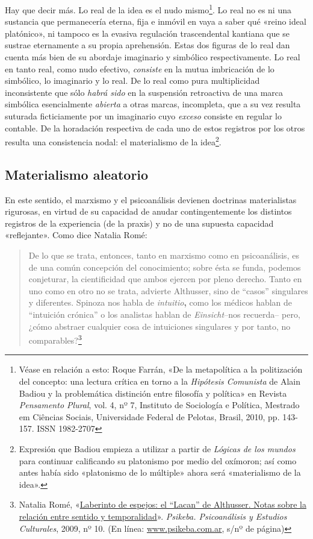 Hay que decir más. Lo real de la idea es el nudo mismo\footnote{Véase en relación a esto: Roque Farrán, «De la metapolítica a la politización del concepto: una lectura crítica en torno a la \emph{Hipótesis Comunista} de Alain Badiou y la problemática distinción entre filosofía y política» en Revista \emph{Pensamento Plural}, vol. 4, nº 7, Instituto de Sociología e Política, Mestrado em Ciências Sociais, Universidade Federal de Pelotas, Brasil, 2010, pp. 143-157. ISSN 1982-2707}. Lo real no es ni una sustancia que permanecería eterna, fija e inmóvil en vaya a saber qué «reino ideal platónico», ni tampoco es la evasiva regulación trascendental kantiana que se sustrae eternamente a su propia aprehensión. Estas dos figuras de lo real dan cuenta más bien de su abordaje imaginario y simbólico respectivamente. Lo real en tanto real, como nudo efectivo, \emph{consiste} en la mutua imbricación de lo simbólico, lo imaginario y lo real. De lo real como pura multiplicidad inconsistente que sólo \emph{habrá sido} en la suspensión retroactiva de una marca simbólica esencialmente \emph{abierta} a otras marcas, incompleta, que a su vez resulta suturada ficticiamente por un imaginario cuyo \emph{exceso} consiste en regular lo contable. De la horadación respectiva de cada uno de estos registros por los otros resulta una consistencia nodal: el materialismo de la idea\footnote{Expresión que Badiou empieza a utilizar a partir de \emph{Lógicas de los mundos} para continuar calificando su platonismo por medio del oxímoron; así como antes había sido «platonismo de lo múltiple» ahora será «materialismo de la idea».}.

\subsection{Materialismo aleatorio}

En este sentido, el marxismo y el psicoanálisis devienen doctrinas materialistas rigurosas, en virtud de su capacidad de anudar contingentemente los distintos registros de la experiencia (de la praxis) y no de una supuesta capacidad «reflejante». Como dice Natalia Romé:

\begin{quote}
De lo que se trata, entonces, tanto en marxismo como en psicoanálisis, es de una común concepción del conocimiento; sobre ésta se funda, podemos conjeturar, la cientificidad que ambos ejercen por pleno derecho. Tanto en uno como en otro no se trata, advierte Althusser, sino de ``casos'' singulares y diferentes. Spinoza nos habla de \emph{intuitio}\textbf{,} como los médicos hablan de ``intuición crónica'' o los analistas hablan de \emph{Einsicht}--nos recuerda-- pero, ¿cómo abstraer cualquier cosa de intuiciones singulares y por tanto, no comparables?\footnote{Natalia Romé, «\href{http://www.psikeba.com.ar/articulos2/NR_el_Lacan_de_Althusser.htm}{Laberinto de espejos: el ``Lacan'' de Althusser. Notas sobre la relación entre sentido y temporalidad}». \emph{Psikeba. Psicoanálisis y Estudios Culturales}, 2009, nº 10. (En línea: \href{http://www.psikeba.com.ar/}{www.psikeba.com.ar}, s/nº de página)}
\end{quote}

